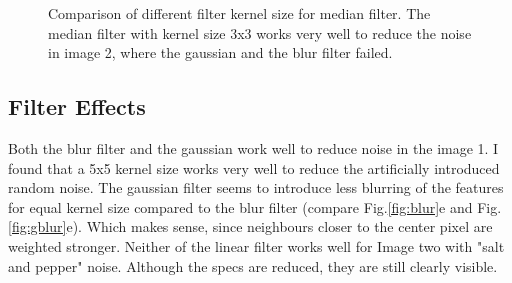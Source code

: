 \documentclass[11pt,a4paper]{article}
\begin{document}
\begin{figure}
\quad
{}
\quad
{}
\quad

\caption{Comparison of different filter kernel size for median filter. The median filter with kernel size 3x3 works very well to reduce the noise in image 2, where the gaussian and the blur filter failed.}%
\label{fig:mblur}%
\end{figure}

\subsection{Filter Effects}
Both the blur filter and the gaussian work well to reduce noise in the image 1. I found that a 5x5 kernel size works very well to reduce the artificially introduced random noise. The gaussian filter seems to introduce less blurring of the features for equal kernel size compared to the blur filter (compare Fig.\ref{fig:blur}e and Fig.\ref{fig:gblur}e). Which makes sense, since neighbours closer to the center pixel are weighted stronger. Neither of the linear filter works well for Image two with "salt and pepper" noise. Although the specs are reduced, they are still clearly visible. 
\end{document}
